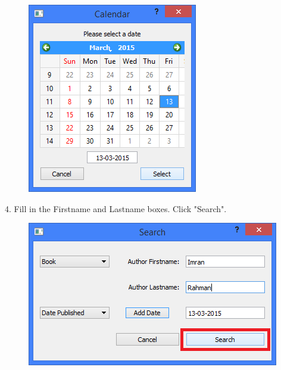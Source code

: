 \begin{figure}[H]
    \includegraphics[width=\textwidth]{./Manual/Tutorial/Q14/SelectDate.png}
\end{figure}

4. Fill in the Firstname and Lastname boxes. Click "Search".

\begin{figure}[H]
    \includegraphics[width=\textwidth]{./Manual/Tutorial/Q14/Search.png}
\end{figure}

